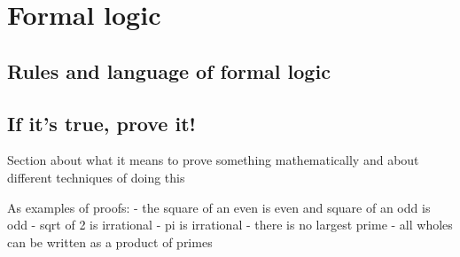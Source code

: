 \chapter{Formal logic}

\section{Rules and language of formal logic}

\section{If it's true, prove it!}

Section about what it means to prove something mathematically and about different techniques of doing this

As examples of proofs:
- the square of an even is even and square of an odd is odd
- sqrt of 2 is irrational
- pi is irrational
- there is no largest prime
- all wholes can be written as a product of primes
